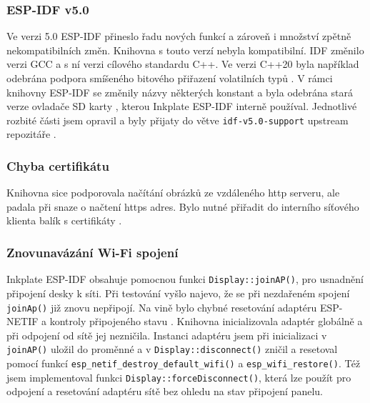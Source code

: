 \subsubsection{ESP-IDF v5.0} Ve verzi 5.0 ESP-IDF přineslo řadu nových funkcí a zároveň i množství zpětně nekompatibilních změn. Knihovna s touto verzí nebyla kompatibilní. IDF změnilo verzi GCC a s ní verzi cílového standardu C++. Ve verzi C++20 byla například odebrána podpora smíšeného bitového přiřazení volatilních typů \cite{jtcDedeprecatingVolatileCompound}. V rámci knihovny ESP-IDF se změnily názvy některých konstant\cite{PeripheralsESP32S2ESPIDF} a byla odebrána stará verze ovladače SD karty \cite{StorageESP32S2ESPIDF}, kterou Inkplate ESP-IDF interně používal. Jednotlivé rozbité části jsem opravil a byly přijaty do větve \verb|idf-v5.0-support| upstream repozitáře \cite{WIPInitialSupport}. 

\subsubsection{Chyba certifikátu} Knihovna sice podporovala načítání obrázků ze vzdáleného http serveru, ale padala při snaze o načtení https adres. Bylo nutné přiřadit do interního síťového klienta balík s certifikáty \cite{MenuconfigVariantSelection}.

\subsubsection{Znovunavázání Wi-Fi spojení} Inkplate ESP-IDF obsahuje pomocnou funkci \lstinline|Display::joinAP()|, pro usnadnění připojení desky k síti. Při testování vyšlo najevo, že se při nezdařeném spojení \lstinline|joinAp()| již znovu nepřipojí. Na vině bylo chybné resetování adaptéru ESP-NETIF a kontroly připojeného stavu \cite{MenuconfigVariantSelection}. Knihovna inicializovala adaptér globálně a při odpojení od sítě jej nezničila. Instanci adaptéru jsem při inicializaci v \lstinline|joinAP()| uložil do proměnné a v \lstinline|Display::disconnect()| zničil a resetoval pomocí funkcí \lstinline|esp_netif_destroy_default_wifi()| a \lstinline|esp_wifi_restore()|\cite{FixedAPReconnection}. Též jsem implementoval funkci \lstinline|Display::forceDisconnect()|, která lze použít pro odpojení a resetování adaptéru sítě bez ohledu na stav připojení panelu\cite{FixedInvalidState}.

